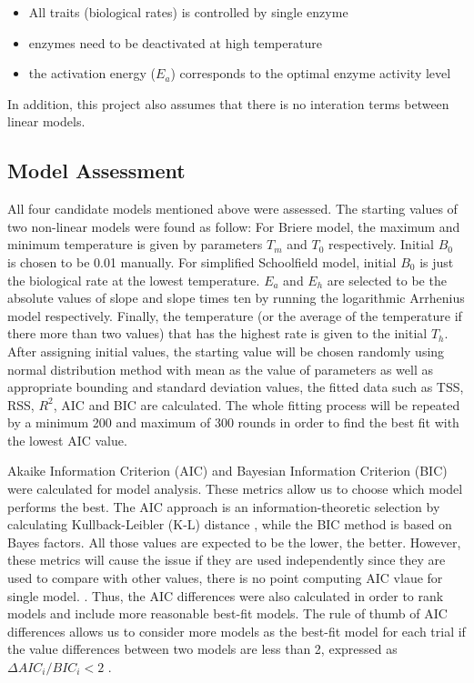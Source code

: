 \begin{itemize}
    \item All traits (biological rates) is controlled by single enzyme \cite{delong_2017}
    \item enzymes need to be deactivated at high temperature \cite{delong_2017}
    \item the activation energy ($E_a$) corresponds to the optimal enzyme activity level \cite{delong_2017}
\end{itemize}

In addition, this project also assumes that there is no interation terms between linear models.

\subsection{Model Assessment}

All four candidate models mentioned above were assessed. The starting values of two non-linear models were found as follow:
For Briere model, the maximum and minimum temperature is given by parameters $T_m$ and $T_0$ respectively. Initial $B_0$ is chosen to be 0.01 manually. For simplified Schoolfield model, initial $B_0$ is just the biological rate at the lowest temperature. $E_a$ and  $E_h$ are selected to be the absolute values of slope and slope times ten by running the logarithmic Arrhenius model respectively.  Finally, the temperature (or the average of the temperature if there more than two values) that has the highest rate is given to the initial $T_h$. After assigning initial values, the starting value will be chosen randomly using normal distribution method with mean as the value of parameters as well as appropriate bounding and standard deviation values, the fitted data such as TSS, RSS, $R^2$, AIC and BIC are calculated. The whole fitting process will be repeated by a minimum 200 and maximum of 300 rounds in order to find the best fit with the lowest AIC value.

Akaike Information Criterion (AIC) and Bayesian Information Criterion (BIC) were calculated for model analysis. These metrics allow us to choose which model performs the best. The AIC approach is an information-theoretic selection by calculating Kullback-Leibler (K-L) distance \cite{burnham_anderson_2004} \cite{burnham_anderson2010}, while the BIC method is based on Bayes factors. All those values are expected to be the lower, the better. However, these metrics will cause the issue if they are used independently since they are used to compare with other values, there is no point computing AIC vlaue for single model. \cite{guthery_2003}. Thus, the AIC differences were also calculated in order to rank models and include more reasonable best-fit models. The rule of thumb of AIC differences allows us to consider more models as the best-fit model for each trial if the value differences between two models are less than 2, expressed as $ \Delta AIC_i/BIC_i < 2$ \cite{burnham_anderson2010}.


